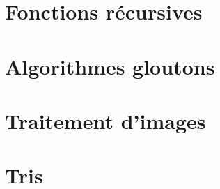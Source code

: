\begin{multicols}{2}
\renewcommand{\td}{02_ExponentiationRapide}
\graphicspath{{\repStyle/png/}{\repExo/\td/images/}}


\section*{Fonctions récursives}
\renewcommand{\repExo}{../../Informatique/S1_Themes/05_FonctionsRecursives}

\renewcommand{\td}{01_AlgorithmesDichotomiques}
\graphicspath{{\repStyle/png/}{\repExo/\td/images/}}


\renewcommand{\td}{02_FiguresAlphaNumeriques}
\graphicspath{{\repStyle/png/}{\repExo/\td/images/}}


\renewcommand{\td}{03_Fractales}
\graphicspath{{\repStyle/png/}{\repExo/\td/images/}}


\renewcommand{\td}{04_EnumerationListes}
\graphicspath{{\repStyle/png/}{\repExo/\td/images/}}


\section*{Algorithmes gloutons}
\renewcommand{\repExo}{../../Informatique/S1_Themes/06_Gloutons}

\renewcommand{\td}{01_RenduMonnaie}
\graphicspath{{\repStyle/png/}{\repExo/\td/images/}}


\renewcommand{\td}{02_AllocationSalles}
\graphicspath{{\repStyle/png/}{\repExo/\td/images/}}



\renewcommand{\td}{03_SelectionActivites}
\graphicspath{{\repStyle/png/}{\repExo/\td/images/}}



\section*{Traitement d'images}
\renewcommand{\repExo}{../../Informatique/S1_Themes/07_Images}

\renewcommand{\td}{01_TraitementImages}
\graphicspath{{\repStyle/png/}{\repExo/\td/images/}}


\renewcommand{\td}{02_Convolution}
\graphicspath{{\repStyle/png/}{\repExo/\td/images/}}


\section*{Tris}
\renewcommand{\repExo}{../../Informatique/S1_Themes/08_Tris}


\end{multicols}
